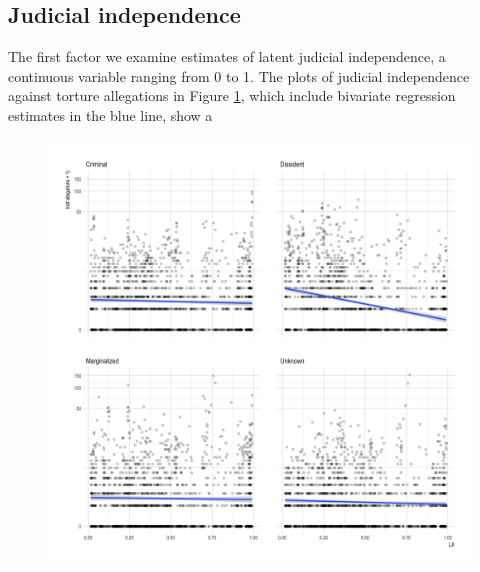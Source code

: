 \documentclass[12pt]{article}
\begin{document}
\subsection*{Judicial independence}

The first factor we examine estimates of latent judicial independence, a continuous variable ranging from 0 to 1. The plots of judicial independence against torture allegations in Figure \ref{fig:lji-bivariate}, which include bivariate regression estimates in the blue line, show a 

\begin{figure}
\begin{center}
\caption{}
\label{fig:lji-bivariate}
\includegraphics[width=.99\textwidth]{../output/scatterplot-itt-allegations-v-lji.png}
\end{center}
\end{figure}
\end{document}
